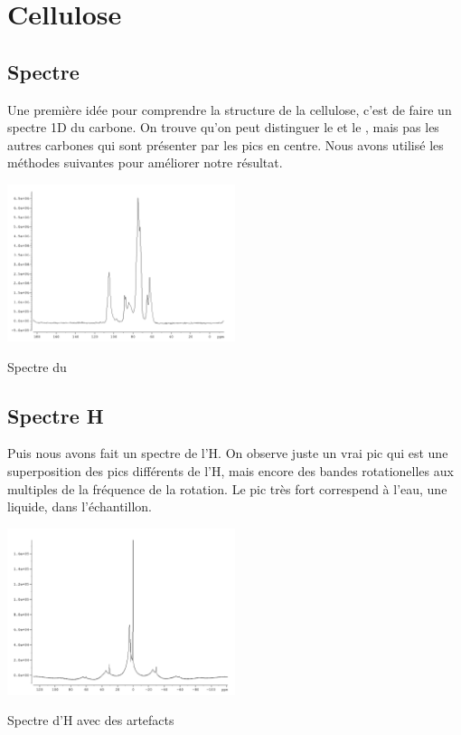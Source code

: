 \documentclass[a4paper,12pt]{scrartcl}
\begin{document}
 \section{Cellulose}

  \subsection{Spectre }
Une première idée pour comprendre la structure de la cellulose, c'est de faire un spectre 1D du carbone. On trouve qu'on peut distinguer le  et le  , mais pas les autres carbones qui sont présenter par  les pics en centre. Nous avons utilisé les méthodes suivantes pour améliorer notre résultat.
 \begin{figurehere}
    \center
    \includegraphics[width=0.5\textwidth]{bilder/c13_spektum.png}
    \caption{\label{carbon}Spectre du }
   \end{figurehere}

  \subsection{Spectre H}
Puis nous avons fait un spectre de l'H. On observe juste un vrai pic qui est une superposition des pics différents de l'H, mais encore des bandes rotationelles aux multiples de la fréquence de la rotation. Le pic très fort correspend à l'eau, une liquide, dans l'échantillon.

\begin{figurehere}
    \center
    \includegraphics[width=0.5\textwidth]{bilder/proton_spektrum.png}
    \caption{Spectre d'H avec des artefacts}
   \end{figurehere}
\end{document}
